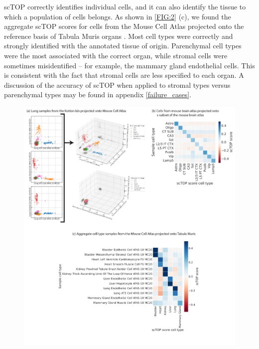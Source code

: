\documentclass[aps,superscriptaddress, notitlepage,longbibliography]{revtex4-1}
\begin{document}
scTOP correctly identifies individual cells, and it can also identify the tissue to which a population of cells belongs. As shown in \ref{FIG:2} (c), we found the aggregate scTOP scores for cells from the Mouse Cell Atlas projected onto the reference basis of Tabula Muris organs \cite{schaum_single-cell_2018}. Most cell types were correctly and strongly identified with the annotated tissue of origin. Parenchymal cell types were the most associated with the correct organ, while stromal cells were sometimes misidentified -- for example, the mammary gland endothelial cells. This is consistent with the fact that stromal cells are less specified to each organ. A discussion of the accuracy of scTOP when applied to stromal types versus parenchymal types may be found in appendix \ref{failure_cases}.

\begin{figure}
	\centering
		\includegraphics[scale=0.7]{figs/fig2.pdf}

\end{figure}
\end{document}
